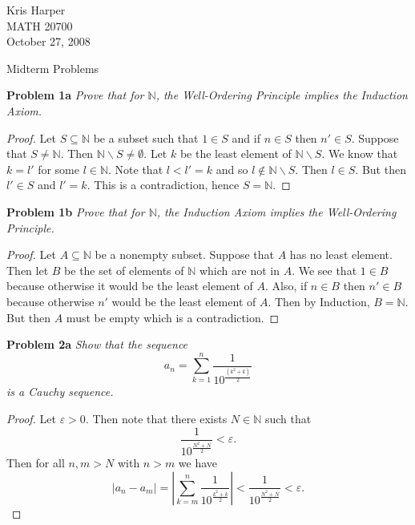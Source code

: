 \documentclass{article}
\begin{document}
\begin{flushright}
Kris Harper\\

MATH 20700\\

October 27, 2008
\end{flushright}

\begin{center}
Midterm Problems
\end{center}

\begin{flushleft}

\textbf{Problem 1a}
\textit{Prove that for $\mathbb{N}$, the Well-Ordering Principle implies the Induction Axiom.}
\begin{proof}
Let $S \subseteq \mathbb{N}$ be a subset such that $1 \in S$ and if $n \in S$ then $n' \in S$. Suppose that $S \neq \mathbb{N}$. Then $\mathbb{N} \backslash S \neq \emptyset$. Let $k$ be the least element of $\mathbb{N} \backslash S$. We know that $k = l'$ for some $l \in \mathbb{N}$. Note that $l < l' = k$ and so $l \notin \mathbb{N} \backslash S$. Then $l \in S$. But then $l' \in S$ and $l'=k$. This is a contradiction, hence $S = \mathbb{N}$.
\end{proof}

\textbf{Problem 1b}
\textit{Prove that for $\mathbb{N}$, the Induction Axiom implies the Well-Ordering Principle.}
\begin{proof}
Let $A \subseteq \mathbb{N}$ be a nonempty subset. Suppose that $A$ has no least element. Then let $B$ be the set of elements of $\mathbb{N}$ which are not in $A$. We see that $1 \in B$ because otherwise it would be the least element of $A$. Also, if $n \in B$ then $n' \in B$ because otherwise $n'$ would be the least element of $A$. Then by Induction, $B = \mathbb{N}$. But then $A$ must be empty which is a contradiction.
\end{proof}

\textbf{Problem 2a}
\textit{Show that the sequence
\[
a_n = \sum_{k=1}^{n} \frac{1}{10^{\frac{(k^2 + k)}{2}}}
\]
is a Cauchy sequence.}
\begin{proof}
Let $\varepsilon > 0$. Then note that there exists $N \in \mathbb{N}$ such that
\[
\frac{1}{10^{\frac{N^2 + N}{2}}} < \varepsilon.
\]
Then for all $n, m > N$ with $n > m$ we have
\[
|a_n - a_m| = \left | \sum_{k=m}^{n} \frac{1}{10^{\frac{k^2+k}{2}}} \right | < \frac{1}{10^{\frac{N^2 + N}{2}}} < \varepsilon.
\]
\end{proof}


\end{flushleft}
\end{document}
